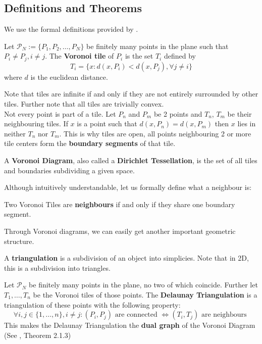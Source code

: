 \subsection{Definitions and Theorems}
We use the formal definitions provided by \cite{Green1978}.
\begin{definition}
Let $\mathcal{P}_N := \{P_1, P_2, \dots, P_N\}$ be finitely many points in the plane such that $P_i \neq P_j, i\neq j$. The \textbf{Voronoi tile} of $P_i$ is the set $T_i$ defined by
\[
T_i = \{
  x : d(x, P_i) < d(x, P_j), \forall j \neq i
\}
\]
where $d$ is the euclidean distance.
\end{definition}
Note that tiles are infinite if and only if they are not entirely surrounded by other tiles. Further note that all tiles are trivially convex.\\
Not every point is part of a tile. Let $P_n$ and $P_m$ be 2 points and $T_n$, $T_m$ be their neighbouring tiles. If $x$ is a point such that $d(x, P_n) = d(x, P_m)$ then $x$ lies in neither $T_n$ nor $T_m$. This is why tiles are open, all points neighbouring 2 or more tile centers form the \textbf{boundary segments} of that tile.
\begin{definition}
A \textbf{Voronoi Diagram}, also called a \textbf{Dirichlet Tessellation}, is the set of all tiles and boundaries subdividing a given space.
\end{definition}
Although intuitively understandable, let us formally define what a neighbour is:
\begin{definition}[Neighbour]
Two Voronoi Tiles are \textbf{neighbours} if and only if they share one boundary segment.
\end{definition}
Through Voronoi diagrams, we can easily get another important geometric structure.
\begin{definition}[Triangulation]
A \textbf{triangulation} is a subdivision of an object into simplicies. Note that in 2D, this is a subdivision into triangles.
\end{definition}
\begin{definition}
Let $\mathcal{P}_N$ be finitely many points in the plane, no two of which coincide. Further let $T_1, \dots, T_n$ be the Voronoi tiles of those points. The \textbf{Delaunay Triangulation} is a triangulation of these points with the following property:
\[
\forall i,j \in \{1,\dots,n\}, i \neq j: (P_i, P_j) \text{ are connected } \Leftrightarrow (T_i, T_j) \text{ are neighbours }
\]
This makes the Delaunay Triangulation the \textbf{dual graph} of the Voronoi Diagram (See \cite{FORTUNE1995}, Theorem 2.1.3)
\end{definition}
